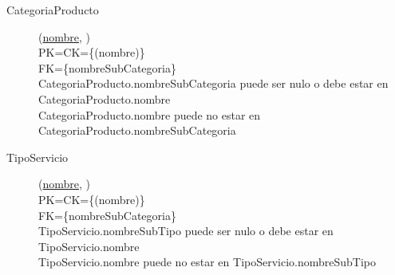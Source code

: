 \begin{description}
 \item[CategoriaProducto](\underline{nombre}, )\\
PK=CK=\{(nombre)\}\\
FK=\{nombreSubCategoria\}\\
CategoriaProducto.nombreSubCategoria puede ser nulo o debe estar en CategoriaProducto.nombre\\
CategoriaProducto.nombre puede no estar en CategoriaProducto.nombreSubCategoria

 \item[TipoServicio](\underline{nombre}, )\\
PK=CK=\{(nombre)\}\\
FK=\{nombreSubCategoria\}\\
TipoServicio.nombreSubTipo puede ser nulo o debe estar en TipoServicio.nombre\\
TipoServicio.nombre puede no estar en TipoServicio.nombreSubTipo

\end{description}

\newpage
